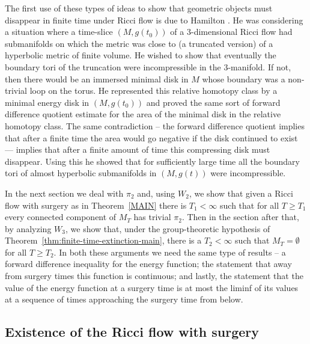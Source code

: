 The first use of these types of ideas to show that geometric objects
must disappear in finite time under Ricci flow is due to Hamilton
\cite{HamiltonNSRF3M}. He was considering a situation where a
time-slice $(M,g(t_0))$ of a $3$-dimensional Ricci flow had
submanifolds on which the metric was close to (a truncated version)
of a hyperbolic metric of finite volume. He wished to show that
eventually the boundary tori of the truncation were incompressible
in the $3$-manifold. If not, then there would be an immersed minimal
disk in $M$ whose boundary was a non-trivial loop on the torus. He
represented this relative homotopy class by a minimal energy disk in
$(M,g(t_0))$ and proved the same sort of forward difference quotient
estimate for the area of the minimal disk in the relative homotopy
class.  The same contradiction -- the forward difference quotient
implies that after a finite time the area would go negative if the
disk continued to exist --- implies that after a finite amount of
time this compressing disk must disappear. Using this he showed that
for sufficiently large time all the boundary tori of almost
hyperbolic submanifolds in $(M,g(t))$ were incompressible.

In the next section we deal with $\pi_2$ and, using $W_2$, we show
that given a Ricci flow with surgery as in Theorem~\ref{MAIN} there
is $T_1<\infty$ such that for all $T\ge T_1$ every connected
component of $M_T$ has trivial $\pi_2$. Then in the section after
that, by analyzing $W_3$, we show that, under the group-theoretic
hypothesis of Theorem~\ref{thm:finite-time-extinction-main}, there is a $T_2<\infty$ such
that $M_T=\emptyset$ for all $T\ge T_2$. In both these arguments we
need the same type of results -- a forward difference inequality for
the energy function;  the statement that away from surgery times
this function is continuous; and lastly, the statement that the
value of the energy function at a surgery time is at most the liminf
of its values at a sequence of times approaching the surgery time
from below.

\subsection{Existence of the Ricci flow with surgery}

